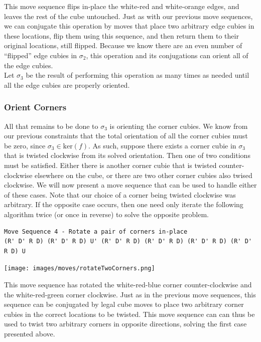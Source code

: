 \documentclass[10pt,letterpaper]{report}
\begin{document}
This move sequence flips in-place the white-red and white-orange edges, and leaves the rest of the cube untouched.  Just as with our previous move sequences, we can conjugate this operation by moves that place two arbitrary edge cubies in these locations, flip them using this sequence, and then return them to their original locations, still flipped.  Because we know there are an even number of ``flipped'' edge cubies in $\sigma_2$, this operation and its conjugations can orient all of the edge cubies. \\

Let $\sigma_3$ be the result of performing this operation as many times as needed until all the edge cubies are properly oriented.

\subsubsection{Orient Corners}

All that remains to be done to $\sigma_3$ is orienting the corner cubies.  We know from our previous constraints that the total orientation of all the corner cubies must be zero, since $\sigma_3 \in \text{ker}(f)$.  As such, suppose there exists a corner cubie in $\sigma_3$ that is twisted clockwise from its solved orientation.  Then one of two conditions must be satisfied.  Either there is another corner cubie that is twisted counter-clockwise elsewhere on the cube, or there are two other corner cubies also twised clockwise.  We will now present a move sequence that can be used to handle either of these cases.  Note that our choice of a corner being twisted clockwise was arbitrary.  If the opposite case occurs, then one need only iterate the following algorithm twice (or once in reverse) to solve the opposite problem.

\begin{verbatim}
Move Sequence 4 - Rotate a pair of corners in-place
(R' D' R D) (R' D' R D) U' (R' D' R D) (R' D' R D) (R' D' R D) (R' D' R D) U
\end{verbatim}

\begin{center}
\texttt{[image: images/moves/rotateTwoCorners.png]} 
\end{center}

This move sequence has rotated the white-red-blue corner counter-clockwise and the white-red-green corner clockwise.  Just as in the previous move sequences, this sequence can be conjugated by legal cube moves to place two arbitrary corner cubies in the correct locations to be twisted.  This move sequence can can thus be used to twist two arbitrary corners in opposite directions, solving the first case presented above. \\
\end{document}
